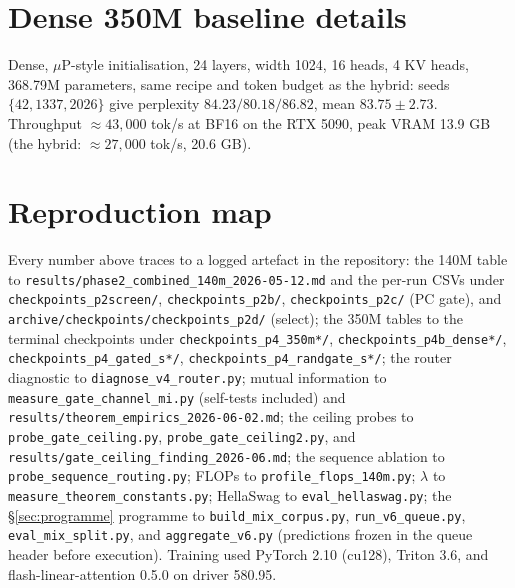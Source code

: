 \documentclass[11pt,a4paper]{article}
\begin{document}
\section{Dense 350M baseline details}
\label{app:dense}

Dense, $\mu$P-style initialisation, 24 layers, width 1024, 16 heads, 4 KV
heads, 368.79M parameters, same recipe and token budget as the hybrid:
seeds $\{42,1337,2026\}$ give perplexity $84.23 / 80.18 / 86.82$, mean
$83.75 \pm 2.73$. Throughput $\approx 43{,}000$ tok/s at BF16 on the RTX
5090, peak VRAM 13.9 GB (the hybrid: $\approx 27{,}000$ tok/s, 20.6 GB).



\section{Reproduction map}
\label{app:repro}

Every number above traces to a logged artefact in the repository:
the 140M table to \texttt{results/phase2\_combined\_140m\_2026-05-12.md}
and the per-run CSVs under \texttt{checkpoints\_p2screen/},
\texttt{checkpoints\_p2b/}, \texttt{checkpoints\_p2c/} (PC gate), and
\texttt{archive/checkpoints/checkpoints\_p2d/} (select);
the 350M tables to the terminal checkpoints under
\texttt{checkpoints\_p4\_350m*/}, \texttt{checkpoints\_p4b\_dense*/},
\texttt{checkpoints\_p4\_gated\_s*/}, \texttt{checkpoints\_p4\_randgate\_s*/};
the router diagnostic to \texttt{diagnose\_v4\_router.py};
mutual information to \texttt{measure\_gate\_channel\_mi.py}
(self-tests included) and \texttt{results/theorem\_empirics\_2026-06-02.md};
the ceiling probes to \texttt{probe\_gate\_ceiling.py},
\texttt{probe\_gate\_ceiling2.py}, and
\texttt{results/gate\_ceiling\_finding\_2026-06.md};
the sequence ablation to \texttt{probe\_sequence\_routing.py};
FLOPs to \texttt{profile\_flops\_140m.py};
$\lambda$ to \texttt{measure\_theorem\_constants.py};
HellaSwag to \texttt{eval\_hellaswag.py};
the \S\ref{sec:programme} programme to \texttt{build\_mix\_corpus.py},
\texttt{run\_v6\_queue.py}, \texttt{eval\_mix\_split.py}, and
\texttt{aggregate\_v6.py} (predictions frozen in the queue header before
execution).
Training used PyTorch 2.10 (cu128), Triton 3.6, and
flash-linear-attention 0.5.0 on driver 580.95.
\end{document}
